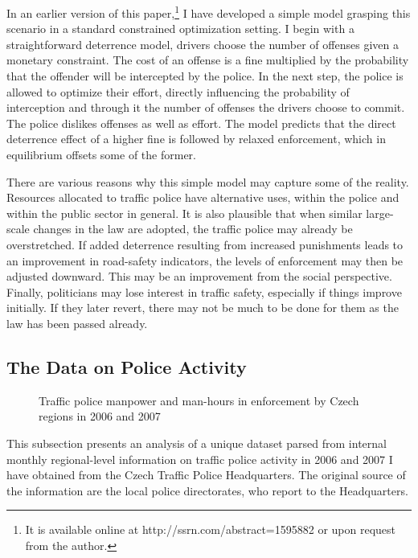 \documentclass[12pt]{article}
\begin{document}
In an earlier version of this paper,\footnote{It is available online at
  http://ssrn.com/abstract=1595882 or upon request from the author.} I have
developed a simple model grasping this scenario in a standard constrained
optimization setting. I begin with a straightforward deterrence model, drivers
choose the number of offenses given a monetary constraint. The cost of an
offense is a fine multiplied by the probability that the offender will be
intercepted by the police. In the next step, the police is allowed to optimize
their effort, directly influencing the probability of interception and through
it the number of offenses the drivers choose to commit. The police dislikes
offenses as well as effort. The model predicts that the direct deterrence effect
of a higher fine is followed by relaxed enforcement, which in equilibrium
offsets some of the former.  
  
There are various reasons why this simple model may capture some of the reality.
Resources allocated to traffic police have alternative uses, within the police
and within the public sector in general. It is also plausible that when similar
large-scale changes in the law are adopted, the traffic police may already be
overstretched. If added deterrence resulting from increased punishments leads to
an improvement in road-safety indicators, the levels of enforcement may then be
adjusted downward. This may be an improvement from the social perspective.
Finally, politicians may lose interest in traffic safety, especially if things
improve initially. If they later revert, there may not be much to be done for
them as the law has been passed already.

\subsection{The Data on Police Activity} %

\begin{figure}[t] 
  \caption{Traffic police manpower and man-hours in enforcement by Czech regions
    in 2006 and 2007
  }
  \label{fig:police} 
\end{figure}

This subsection presents an analysis of a unique dataset parsed from internal
monthly regional-level information on traffic police activity in 2006 and 2007 I
have obtained from the Czech Traffic Police Headquarters. The original source of
the information are the local police directorates, who report to the
Headquarters.
\end{document}
